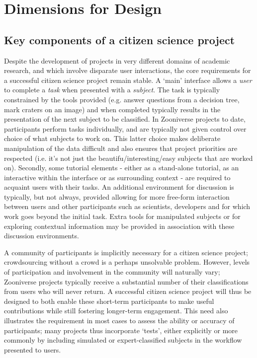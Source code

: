\documentclass{sigchi}
\begin{document}

\section{Dimensions for Design}

\subsection{Key components of a citizen science project}

Despite the development of projects in very different domains of academic research, and which involve disparate user interactions, the core requirements for a successful citizen science project remain stable. A `main' interface allows a \emph{user} to complete a \emph{task} when presented with a \emph{subject}. The task is typically constrained by the tools provided (e.g. answer questions from a decision tree, mark craters on an image) and when completed typically results in the presentation of the next subject to be classified. In Zooniverse projects to date, participants perform tasks individually, and are typically not given control over choice of what subjects to work on. This latter choice makes deliberate manipulation of the data difficult and also ensures that project priorities are respected (i.e. it's not just the beautifu/interesting/easy subjects that are worked on). Secondly, some tutorial elements - either as a stand-alone tutorial, as an interactive within the interface or as surrounding context - are required to acquaint users with their tasks. An additional environment for discussion is typically, but not always, provided allowing for more free-form interaction between users and other participants such as scientists, developers and for which work goes beyond the initial task. Extra tools for manipulated subjects or for exploring contextual information may be provided in association with these discussion environments. 

A community of participants is implicitly necessary for a citizen science project; crowdsourcing without a crowd is a perhaps unsolvable problem. However, levels of participation and involvement in the community will naturally vary; Zooniverse projects typically receive a substantial number of their classifications from users who will never return. A successful citizen science project will thus be designed to both enable these short-term participants to make useful contributions while still fostering longer-term engagement. This need also illustrates the requirement in most cases to assess the ability or accuracy of participants; many projects thus incorporate `tests', either explicitly or more commonly by including simulated or expert-classified subjects in the workflow presented to users. 
\end{document}
